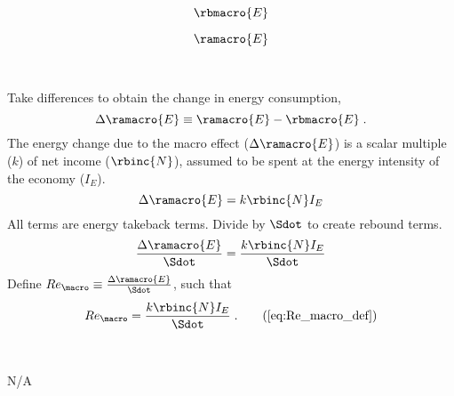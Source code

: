 

\begin{landscape}

\linespread{1}


\sectionsep{}

{
\begin{equation}
  \rbmacro{E}
\end{equation}
}
{
}

\sectionsep{}

{
\begin{equation}
\ramacro{E}
\end{equation}
}
{
}

\sectionsep{}

\derivsection{}
{
~

Take differences to obtain the change in energy consumption,
%
\begin{equation}
  \Delta \ramacro{E} \equiv \ramacro{E} - \rbmacro{E} \; .
\end{equation}
%
The energy change due to the macro effect ($\Delta \ramacro{E}$) 
is a scalar multiple ($k$) of net income ($\rbinc{N}$), 
assumed to be spent at the energy intensity of the economy ($I_E$).
%
\begin{equation}
  \Delta \ramacro{E} = k \rbinc{N} I_E
\end{equation}
%
All terms are energy takeback terms.
Divide by $\Sdot$
to create rebound terms.
%
\begin{equation}
  \frac{\Delta \ramacro{E}}{\Sdot} = \frac{k \rbinc{N} I_E}{\Sdot}
\end{equation}
%
Define 
$Re_{\macro} \equiv \frac{\Delta \ramacro{E}}{\Sdot}$, 
such that
%
\begin{equation}
  Re_{\macro} = \frac{k \rbinc{N} I_E}{\Sdot} \; . \tag{\ref{eq:Re_macro_def}}
\end{equation}
%
}
{
~
\centering

N/A
}
\end{landscape}
